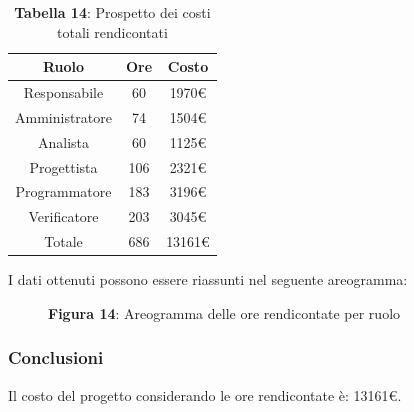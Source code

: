 \begin{table}[H]
	\centering
	\renewcommand{\arraystretch}{1.5}
	\begin{tabular}{|c|c|c|}
		\hline
		\rowcolor{lighter-grayer}
		Ruolo & Ore & Costo \\
		\hline
		Responsabile & 60 & 1970\euro \\
		\hline
		Amministratore & 74 & 1504\euro \\
		\hline
		Analista & 60 & 1125\euro \\
		\hline
		Progettista & 106 & 2321\euro \\
		\hline
		Programmatore & 183 & 3196\euro \\
		\hline
		Verificatore & 203 & 3045\euro \\
		\hline
		Totale & 686 &  13161\euro \\
		\hline
	\end{tabular}
	\caption*{\textbf{Tabella 14}: Prospetto dei costi totali rendicontati \\}
\end{table}

I dati ottenuti possono essere riassunti nel seguente areogramma:


\begin{figure}[H]
	\centering
	\caption*{\textbf{Figura 14}: Areogramma delle ore rendicontate per ruolo}
    \label{fig:Figura10}
\end{figure}

\subsubsection{Conclusioni}
Il costo del progetto considerando le ore rendicontate è: 13161\euro.